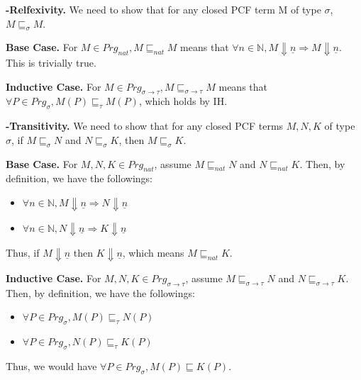 
\textbf{-Relfexivity.}
We need to show that for any closed PCF term M of type $\sigma$, $M \sqsubseteq_\sigma M$.

\textbf{Base Case.} For $ M \in Prg_{nat}, M \sqsubseteq_{nat} M $ means that $\forall n \in \mathbb{N}, M \Downarrow \underline{n} \Rightarrow M \Downarrow \underline{n} $. This is trivially true.

\textbf{Inductive Case.} For $ M \in Prg_{\sigma \to \tau}, M \sqsubseteq_{\sigma \to \tau} M $ means that $ \forall P \in Prg_\sigma, M(P) \sqsubseteq_\tau M(P) $, which holds by IH.

\textbf{-Transitivity.} We need to show that for any closed PCF terms $ M, N, K $ of type $\sigma$, if $ M \sqsubseteq_\sigma N $ and $ N \sqsubseteq_\sigma K $, then $ M \sqsubseteq_\sigma K $.

\textbf{Base Case.} For $M, N, K \in Prg_{nat} $, assume $ M \sqsubseteq_{nat} N $ and $ N \sqsubseteq_{nat} K $. Then, by definition, we have the followings:

\begin{itemize}
    \item $ \forall n \in \mathbb{N}, M \Downarrow \underline{n} \Rightarrow N \Downarrow \underline{n} $
    \item $ \forall n \in \mathbb{N}, N \Downarrow \underline{n} \Rightarrow K \Downarrow \underline{n} $
\end{itemize}
Thus, if $ M \Downarrow \underline{n} $ then $ K \Downarrow \underline{n} $, which means $ M \sqsubseteq_{nat} K $.

\textbf{Inductive Case.} For $ M, N, K \in Prg_{\sigma \to \tau} $, assume $ M \sqsubseteq_{\sigma \to \tau} N $ and $ N \sqsubseteq_{\sigma \to \tau} K $. Then, by definition, we have the followings:

\begin{itemize}
    \item $ \forall P \in Prg_\sigma, M(P) \sqsubseteq_\tau N(P) $ 
    \item $ \forall P \in Prg_\sigma, N(P) \sqsubseteq_\tau K(P) $ 
\end{itemize}
Thus, we would have $ \forall P \in Prg_\sigma, M(P) \sqsubseteq K(P) $.